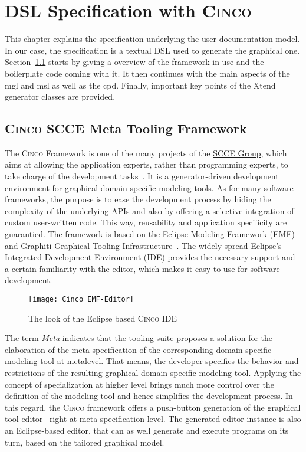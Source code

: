 
\chapter{DSL Specification with \textsc{Cinco}}\label{ch:DSL}

This chapter explains the specification underlying the user documentation model.  In our case, the specification is a textual DSL used to generate the graphical one. Section~\ref{sec:CTF} starts by giving a overview of the framework in use and the boilerplate code coming with it. It then continues with the main aspects of the \acrfull{mgl} and \acrfull{msl} as well as the \acrfull{cpd}. Finally, important key points of the Xtend generator classes are provided.

\section{\textsc{Cinco} SCCE Meta Tooling Framework}\label{sec:CTF}

The \textsc{Cinco} Framework is one of the many projects of the \href{https://www.scce.info/}{SCCE Group}, which aims at allowing the application experts, rather than programming experts, to take charge of the development tasks~\cite{scce}. It is a generator-driven development environment for graphical domain-specific modeling tools. As for many software frameworks, the purpose is to ease the development process by hiding the complexity of the underlying APIs and also by offering a selective integration of custom user-written code. This way, reusability and application specificity are guarantied. The framework is based on the Eclipse Modeling Framework (EMF) and Graphiti Graphical Tooling Infrastructure~\cite{Cinco}. The widely spread Eclipse's Integrated Development Environment (IDE) provides the necessary support and a certain familiarity with the editor, which makes it easy to use for software development.
\begin{figure}[h]
    \centering
    \texttt{[image: Cinco\_EMF-Editor]}
    \caption{The look of the Eclipse based \textsc{Cinco} IDE}
\end{figure}

The term \textit{Meta} indicates that the tooling suite proposes a solution for the elaboration of the meta-specification of the corresponding domain-specific modeling tool at metalevel. That means, the developer specifies the behavior and restrictions of the resulting graphical domain-specific modeling tool. Applying the concept of specialization at higher level brings much more control over the definition of the modeling tool and hence simplifies the development process. In this regard, the \textsc{Cinco} framework offers a push-button generation of the graphical tool editor~\cite{scce} right at meta-specification level. The generated editor instance is also an Eclipse-based editor, that can as well generate and execute programs on its turn, based on the tailored graphical model.

